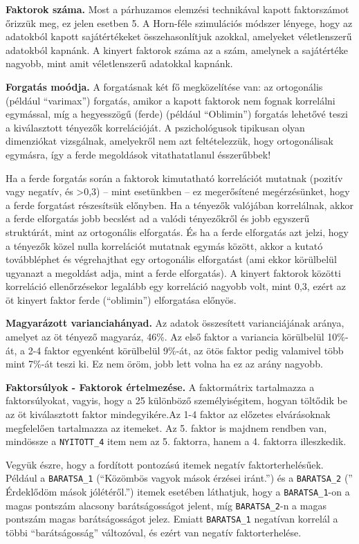 \documentclass[
  letterpaper,
]{krantz}
\begin{document}
\textbf{Faktorok száma.} Most a párhuzamos elemzési technikával kapott
faktorszámot őrizzük meg, ez jelen esetben 5. A Horn-féle szimulációs
módszer lényege, hogy az adatokból kapott sajátértékeket
összehasonlítjuk azokkal, amelyeket véletlenszerű adatokból kapnánk. A
kinyert faktorok száma az a szám, amelynek a sajátértéke nagyobb, mint
amit véletlenszerű adatokkal kapnánk.

\textbf{Forgatás moódja.} A forgatásnak két fő megközelítése van: az
ortogonális (például ``varimax'') forgatás, amikor a kapott faktorok nem
fognak korrelálni egymással, míg a hegyesszögű (ferde) (például
``Oblimin'') forgatás lehetővé teszi a kiválasztott tényezők
korrelációját. A pszichológusok tipikusan olyan dimenziókat vizsgálnak,
amelyekről nem azt feltételezzük, hogy ortogonálisak egymásra, így a
ferde megoldások vitathatatlanul ésszerűbbek!

Ha a ferde forgatás során a faktorok kimutatható korrelációt mutatnak
(pozitív vagy negatív, és \textgreater0,3) -- mint esetünkben -- ez
megerősítené megérzésünket, hogy a ferde forgatást részesítsük előnyben.
Ha a tényezők valójában korrelálnak, akkor a ferde elforgatás jobb
becslést ad a valódi tényezőkről és jobb egyszerű struktúrát, mint az
ortogonális elforgatás. És ha a ferde elforgatás azt jelzi, hogy a
tényezők közel nulla korrelációt mutatnak egymás között, akkor a kutató
továbbléphet és végrehajthat egy ortogonális elforgatást (ami ekkor
körülbelül ugyanazt a megoldást adja, mint a ferde elforgatás). A
kinyert faktorok közötti korreláció ellenőrzésekor legalább egy
korreláció nagyobb volt, mint 0,3, ezért az öt kinyert faktor ferde
(``oblimin'') elforgatása előnyös.

\textbf{Magyarázott varianciahányad.} Az adatok összesített
varianciájának aránya, amelyet az öt tényező magyaráz, 46\%. Az első
faktor a variancia körülbelül 10\%-át, a 2-4 faktor egyenként körülbelül
9\%-át, az ötös faktor pedig valamivel több mint 7\%-át teszi ki. Ez nem
öröm, jobb lett volna ha ez az arány nagyobb.

\textbf{Faktorsúlyok - Faktorok értelmezése.} A faktormátrix tartalmazza
a faktorsúlyokat, vagyis, hogy a 25 különböző személyiségitem, hogyan
töltődik be az öt kiválasztott faktor mindegyikére.Az 1-4 faktor az
előzetes elvárásoknak megfelelően tartalmazza az itemeket. Az 5. faktor
is majdnem rendben van, mindössze a \texttt{NYITOTT\_4} item nem az 5.
faktorra, hanem a 4. faktorra illeszkedik.

Vegyük észre, hogy a fordított pontozású itemek negatív
faktorterhelésűek. Például a \texttt{BARATSA\_1} (``Közömbös vagyok
mások érzései iránt.'') és a \texttt{BARATSA\_2} ('' Érdeklődöm mások
jólétéről.'') itemek esetében láthatjuk, hogy a \texttt{BARATSA\_1}-on a
magas pontszám alacsony barátságosságot jelent, míg
\texttt{BARATSA\_2}-n a magas pontszám magas barátságosságot jelez.
Emiatt \texttt{BARATSA\_1} negatívan korrelál a többi ``barátságosság''
változóval, és ezért van negatív faktorterhelése.
\end{document}
